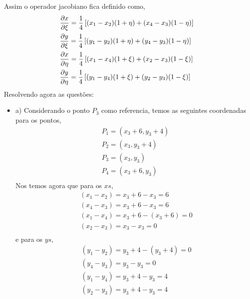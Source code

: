 %
Assim o operador jacobiano fica definido como,
%
\begin{equation}
	\begin{split}
&	\frac{\partial x}{\partial \xi } = \frac{1}{4}\left[ (x_1 - x_2)(1 + \eta) + (x_4 - x_3)(1 - \eta) \right]\\
&   \frac{\partial y}{\partial \xi } = \frac{1}{4}\left[ (y_1 - y_2)(1 + \eta) + (y_4 - y_3)(1 - \eta) \right]\\
&   \frac{\partial x}{\partial \eta} = \frac{1}{4}\left[ (x_1 - x_4)(1 + \xi ) + (x_2 - x_3)(1 - \xi ) \right]\\
&   \frac{\partial y}{\partial \eta} = \frac{1}{4}\left[ (y_1 - y_4)(1 + \xi ) + (y_2 - y_3)(1 - \xi ) \right]
	\end{split}
\end{equation}
%
Resolvendo agora as questões:
%
\begin{itemize}
	\item a)
	Considerando o ponto $P_3$ como referencia, temos as seguintes coordenadas para os pontos,
	\begin{equation}
		\begin{split}
			&	P_1 = (x_3 + 6, y_3 + 4)\\
			&	P_2 = (x_3    , y_3 + 4)\\
			&	P_3 = (x_3    , y_3    )\\
			&	P_4 = (x_3 + 6, y_3    )\\
		\end{split}
	\end{equation}
	Nos temos agora que para os $xs$,
	\begin{equation}
		\begin{split}
			&	(x_1 - x_2) = x_3 + 6 - x_3 = 6 \\
			&	(x_4 - x_3) = x_3 + 6 - x_3 = 6\\
			&	(x_1 - x_4) = x_3 + 6 - (x_3 + 6) = 0\\\
			&	(x_2 - x_3) = x_3 - x_3 = 0\\
		\end{split}
	\end{equation}
	e para os $ys$,
	\begin{equation}
	\begin{split}
		&	(y_1 - y_2) = y_3 + 4 - (y_3 + 4) = 0 \\
		&	(y_4 - y_3) = y_3 - y_3 = 0\\
		&	(y_1 - y_4) = y_3 + 4 - y_3 = 4\\\
		&	(y_2 - y_3) = y_3 + 4 - y_3 = 4\\
	\end{split}
	\end{equation}

\end{itemize}
